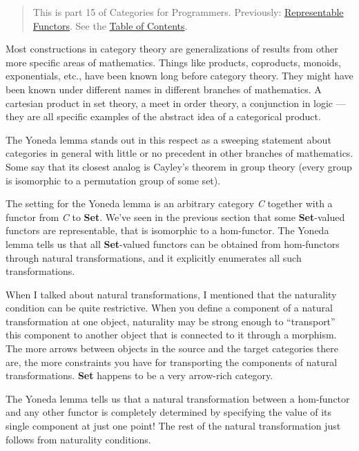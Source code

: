 \begin{quote}
This is part 15 of Categories for Programmers. Previously:
\href{https://bartoszmilewski.com/2015/07/29/representable-functors/}{Representable
Functors}. See the
\href{https://bartoszmilewski.com/2014/10/28/category-theory-for-programmers-the-preface/}{Table
of Contents}.
\end{quote}

Most constructions in category theory are generalizations of results
from other more specific areas of mathematics. Things like products,
coproducts, monoids, exponentials, etc., have been known long before
category theory. They might have been known under different names in
different branches of mathematics. A cartesian product in set theory, a
meet in order theory, a conjunction in logic --- they are all specific
examples of the abstract idea of a categorical product.

The Yoneda lemma stands out in this respect as a sweeping statement
about categories in general with little or no precedent in other
branches of mathematics. Some say that its closest analog is Cayley's
theorem in group theory (every group is isomorphic to a permutation
group of some set).

The setting for the Yoneda lemma is an arbitrary category \emph{C}
together with a functor  from \emph{C} to \textbf{Set}. We've
seen in the previous section that some \textbf{Set}-valued functors are
representable, that is isomorphic to a hom-functor. The Yoneda lemma
tells us that all \textbf{Set}-valued functors can be obtained from
hom-functors through natural transformations, and it explicitly
enumerates all such transformations.

When I talked about natural transformations, I mentioned that the
naturality condition can be quite restrictive. When you define a
component of a natural transformation at one object, naturality may be
strong enough to ``transport'' this component to another object that is
connected to it through a morphism. The more arrows between objects in
the source and the target categories there are, the more constraints you
have for transporting the components of natural transformations.
\textbf{Set} happens to be a very arrow-rich category.

The Yoneda lemma tells us that a natural transformation between a
hom-functor and any other functor  is completely determined by
specifying the value of its single component at just one point! The rest
of the natural transformation just follows from naturality conditions.

